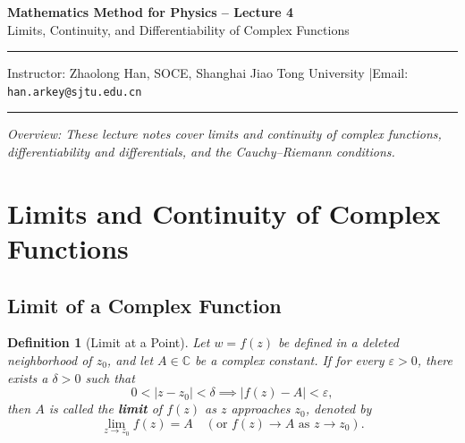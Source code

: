 \documentclass[11pt,a4paper]{article}
\theoremstyle{definitionbreak}
\newtheorem{definition}{Definition}
\theoremstyle{examplebreak}
\theoremstyle{theorembreak}
\begin{document}
\begin{center}
    {\LARGE \textbf{Mathematics Method for Physics -- Lecture 4}} \\[0.4em]
    {\large Limits, Continuity, and Differentiability of Complex Functions}
\end{center}

\vspace{-0.4em}
\noindent\rule{\textwidth}{0.6pt}
\vspace{0.1em}

\begin{center}
    Instructor: Zhaolong Han, SOCE, Shanghai Jiao Tong University \quad|\quad Email: \texttt{han.arkey@sjtu.edu.cn}
\end{center}

\vspace{0.1em}
\noindent\rule{\textwidth}{0.6pt}

\vspace{0.5em}
\noindent \textit{Overview: These lecture notes cover limits and continuity of complex functions, differentiability and differentials, and the Cauchy--Riemann conditions.}

\vspace{0.8em}

\section{Limits and Continuity of Complex Functions}

\subsection{Limit of a Complex Function}

\begin{definition}[Limit at a Point]
Let $w = f(z)$ be defined in a deleted neighborhood of $z_0$, and let $A \in \mathbb{C}$ be a complex constant. If for every $\varepsilon > 0$, there exists a $\delta > 0$ such that
\[
    0 < |z - z_0| < \delta \implies |f(z) - A| < \varepsilon,
\]
then $A$ is called the \textbf{limit} of $f(z)$ as $z$ approaches $z_0$, denoted by
\[
    \lim_{z \to z_0} f(z) = A \quad (\text{or } f(z) \to A \text{ as } z \to z_0).
\]
\end{definition}
\end{document}
